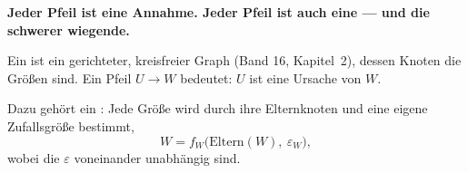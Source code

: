 \begin{merksatz}
\begin{center}
\begin{minipage}{0.9\textwidth}
\textbf{Jeder Pfeil ist eine Annahme. Jeder  Pfeil ist auch eine --- und die schwerer wiegende.}
\end{minipage}
\end{center}

\begin{center}
\begin{minipage}{0.88\textwidth}
\end{minipage}
\end{center}
\end{merksatz}

\begin{definition}
Ein  ist ein gerichteter, kreisfreier Graph (Band 16, Kapitel~2), dessen Knoten die Größen sind. Ein Pfeil $U \to W$ bedeutet: $U$ ist eine  Ursache von $W$.

Dazu gehört ein : Jede Größe wird durch ihre Elternknoten und eine eigene Zufallsgröße bestimmt,
\[ W = f_W\bigl(\text{Eltern}(W),\ \varepsilon_W\bigr) , \]
wobei die $\varepsilon$ voneinander unabhängig sind.
\end{definition}

